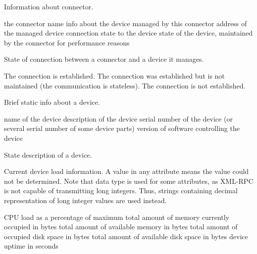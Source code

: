 \begin{Api}

Information about connector.
\begin{ApiClassAttributes}
 the connector name
 info about the device managed by this connector
 address of the managed device
 connection state to the device
 state of the device, maintained by the connector for performance reasons
\end{ApiClassAttributes}

State of connection between a connector and a device it manages.
\begin{ApiEnumValues}
 The connection is established.
 The connection was established but is not maintained (the communication is stateless).
 The connection is not established.
\end{ApiEnumValues}

Brief static info about a device.
\begin{ApiClassAttributes}
 name of the device
 description of the device
 serial number of the device (or several serial number of some device parts)
 version of software controlling the device
\end{ApiClassAttributes}

State description of a device.
\todo{}

Current device load information. A  value in any attribute means the value could not be determined. Note that  data type is used for some attributes, as XML-RPC is not capable of transmitting long integers. Thus, strings containing decimal representation of long integer values are used instead.
\begin{ApiClassAttributes}
 CPU load as a percentage of maximum
 total amount of memory currently occupied in bytes
 total amount of available memory in bytes
 total amount of occupied disk space in bytes
 total amount of available disk space in bytes
 device uptime in seconds
\end{ApiClassAttributes}


\end{Api}
